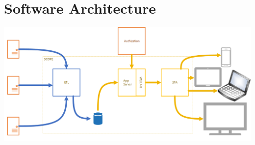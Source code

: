 \documentclass[a4paper,twoside,10pt]{report}
\begin{document}
\newpage
\section{Software Architecture}

\begin{center}
    \includegraphics[width=\textwidth]{lean-dashboard-software-architecture.png}
\end{center}
\end{document}
